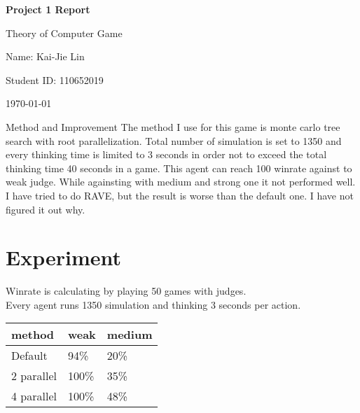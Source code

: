 \documentclass{article} %
\newcommand{\question}[2][]{\begin{flushleft}\textbf{Question #1}: \textit{#2}\end{flushleft}}
\newcommand{\maketitletwo}[2][]{\begin{center}
        \Large{\textbf{Project 1 Report}
        
            Theory of Computer Game} %
        \vspace{5pt}
        
        \normalsize{
            Name: Kai-Jie Lin 
            
            Student ID: 110652019
            
            \today}
        \vspace{15pt}
        \end{center}}
\begin{document}
    \maketitletwo[5]  %
    
    \section{Method and Improvement} 
    The method I use for this game is monte carlo tree search with root parallelization. Total number of simulation is set to 
    1350 and every thinking time is limited to 3 seconds in order not to exceed the total thinking time 40 seconds in a game.
    This agent can reach 100 winrate against to weak judge. While againsting with medium and strong one it not performed well. 
    I have tried to do RAVE, but the result is worse than the default one. I have not figured it out why.
    \section{Experiment}
    Winrate is calculating by playing 50 games with judges. \\
    Every agent runs 1350 simulation and thinking 3 seconds per action.\\
    \begin{tabular}[t]{lll}
    \hline
    method & weak & medium\\
    \hline
    Default & 94\% & 20\% \\
    2 parallel & 100\% & 35\% \\ 
    4 parallel & 100\% & 48\% \\
    \hline
    \end{tabular}
\end{document}
